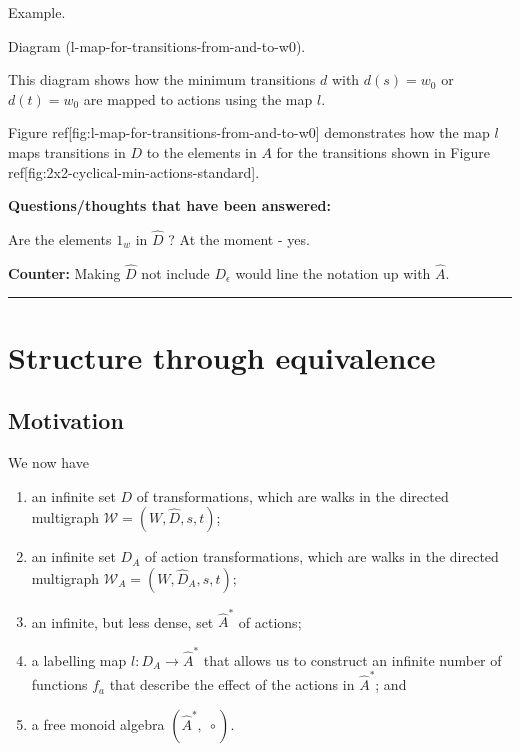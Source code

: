 {\begin{compactitem}
		\item Example.
		\begin{compactitem}
			\item Diagram (l-map-for-transitions-from-and-to-w0).
			\begin{compactitem}
				\item This diagram shows how the minimum transitions $d$ with $d(s) = w_{0}$ or $d(t)= w_{0}$ are mapped to actions using the map $l$.
				\item Figure ref[fig:l-map-for-transitions-from-and-to-w0] demonstrates how the map $l$ maps transitions in $D$ to the elements in $A$ for the transitions shown in Figure ref[fig:2x2-cyclical-min-actions-standard].
			\end{compactitem}
		\end{compactitem}
	\end{compactitem}

	\textbf{Questions/thoughts that have been answered:}
	\begin{compactitem}
		\item Are the elements $1_{w}$ in $\hat{D}$ ? At the moment - yes.
		\begin{compactitem}
			\item \textbf{Counter:} Making $\hat{D}$ not include $D_{\epsilon}$ would line the notation up with $\hat{A}$.
		\end{compactitem}
	\end{compactitem}

	\noindent\rule{\textwidth}{1mm}
}

\section{Structure through equivalence}
\subsection{Motivation}

We now have 
\begin{enumerate}[(1)]
	\item an infinite set $D$ of transformations, which are walks in the directed multigraph $\mathscr{W}=(W, \hat{D}, s, t)$;

	\item an infinite set $D_{A}$ of action transformations, which are walks in the directed multigraph $\mathscr{W}_{A}=(W, \hat{D}_{A}, s, t)$;

	\item an infinite, but less dense, set $\hat{A}^{\ast}$ of actions;

	\item a labelling map $l: D_{A} \to \hat{A}^{\ast}$ that allows us to construct an infinite number of functions $f_{a}$ that describe the effect of the actions in $\hat{A}^{\ast}$; and

    \item a free monoid algebra $(\hat{A}^{\ast}, \; \circ)$.
\end{enumerate}


